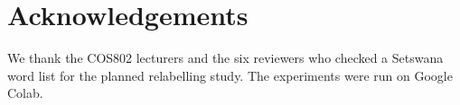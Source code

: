 \section*{Acknowledgements}
We thank the COS802 lecturers and the six reviewers who checked a Setswana word list for the planned relabelling study. The experiments were run on Google Colab.
